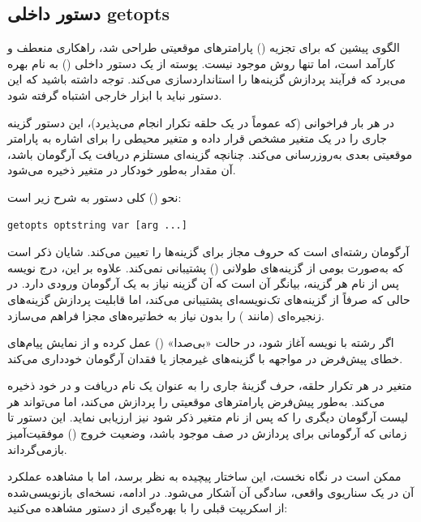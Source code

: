 \subsection{دستور داخلی getopts}

الگوی پیشین که برای تجزیه () پارامترهای موقعیتی طراحی شد، راهکاری منعطف و کارآمد است، اما تنها روش موجود نیست. پوسته  از یک دستور داخلی () به نام  بهره می‌برد که فرآیند پردازش گزینه‌ها را استانداردسازی می‌کند. توجه داشته باشید که این دستور نباید با ابزار خارجی  اشتباه گرفته شود.

در هر بار فراخوانی  (که عموماً در یک حلقه تکرار انجام می‌پذیرد)، این دستور گزینه جاری را در یک متغیر مشخص قرار داده و متغیر محیطی  را برای اشاره به پارامتر موقعیتی بعدی به‌روزرسانی می‌کند. چنانچه گزینه‌ای مستلزم دریافت یک آرگومان باشد، آن مقدار به‌طور خودکار در متغیر  ذخیره می‌شود.

نحو () کلی دستور  به شرح زیر است:

\begin{latin}
\begin{lstlisting}
getopts optstring var [arg ...]
\end{lstlisting}
\end{latin}

آرگومان  رشته‌ای است که حروف مجاز برای گزینه‌ها را تعیین می‌کند. شایان ذکر است که  به‌صورت بومی از گزینه‌های طولانی () پشتیبانی نمی‌کند. علاوه بر این، درج نویسه \cmd{:} پس از نام هر گزینه، بیانگر آن است که آن گزینه نیاز به یک آرگومان ورودی دارد. در حالی که  صرفاً از گزینه‌های تک‌نویسه‌ای پشتیبانی می‌کند، اما قابلیت پردازش گزینه‌های زنجیره‌ای (مانند ) را بدون نیاز به خط‌تیره‌های مجزا فراهم می‌سازد.

اگر رشته  با نویسه \cmd{:} آغاز شود،  در حالت «بی‌صدا» () عمل کرده و از نمایش پیام‌های خطای پیش‌فرض در مواجهه با گزینه‌های غیرمجاز یا فقدان آرگومان خودداری می‌کند.

متغیر  در هر تکرار حلقه، حرف گزینهٔ جاری را به عنوان یک نام دریافت و در خود ذخیره می‌کند.  به‌طور پیش‌فرض پارامترهای موقعیتی را پردازش می‌کند، اما می‌تواند هر لیست آرگومان دیگری را که پس از نام متغیر ذکر شود نیز ارزیابی نماید. این دستور تا زمانی که آرگومانی برای پردازش در صف موجود باشد، وضعیت خروج () موفقیت‌آمیز بازمی‌گرداند.

ممکن است در نگاه نخست، این ساختار پیچیده به نظر برسد، اما با مشاهده عملکرد آن در یک سناریوی واقعی، سادگی آن آشکار می‌شود. در ادامه، نسخه‌ای بازنویسی‌شده از اسکریپت قبلی را با بهره‌گیری از دستور  مشاهده می‌کنید:

